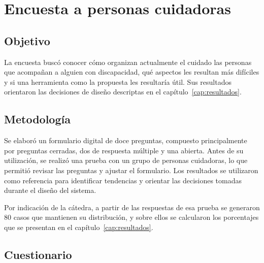 
\chapter{Encuesta a personas cuidadoras}\label{apx:encuesta}

\section{Objetivo}

La encuesta buscó conocer cómo organizan actualmente el cuidado las personas que
acompañan a alguien con discapacidad, qué aspectos les resultan más difíciles y si una
herramienta como la propuesta les resultaría útil. Sus resultados
orientaron las decisiones de diseño descriptas en el
capítulo~\ref{cap:resultados}.

\section{Metodología}

Se elaboró un formulario digital de doce preguntas, compuesto principalmente por preguntas cerradas, dos de respuesta múltiple y una abierta. Antes de su utilización, se realizó una prueba con un grupo de personas cuidadoras, lo que permitió revisar las preguntas y ajustar el formulario. Los resultados se utilizaron como referencia para identificar tendencias y orientar las decisiones tomadas durante el diseño del sistema.

Por indicación de la cátedra, a partir de las respuestas de esa prueba se generaron 80 casos que mantienen su distribución, y sobre ellos se calcularon los porcentajes que se presentan en el capítulo~\ref{cap:resultados}.

\section{Cuestionario}

